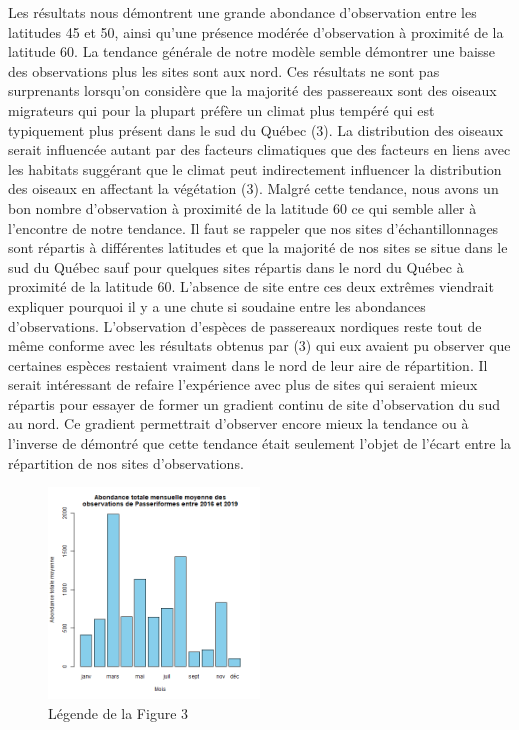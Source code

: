 \documentclass[9pt,twocolumn,twoside,]{pnas-new}
\begin{document}
Les résultats nous démontrent une grande abondance d'observation entre
les latitudes 45 et 50, ainsi qu'une présence modérée d'observation à
proximité de la latitude 60. La tendance générale de notre modèle semble
démontrer une baisse des observations plus les sites sont aux nord. Ces
résultats ne sont pas surprenants lorsqu'on considère que la majorité
des passereaux sont des oiseaux migrateurs qui pour la plupart préfère
un climat plus tempéré qui est typiquement plus présent dans le sud du
Québec (3). La distribution des oiseaux serait influencée autant par des
facteurs climatiques que des facteurs en liens avec les habitats
suggérant que le climat peut indirectement influencer la distribution
des oiseaux en affectant la végétation (3). Malgré cette tendance, nous
avons un bon nombre d'observation à proximité de la latitude 60 ce qui
semble aller à l'encontre de notre tendance. Il faut se rappeler que nos
sites d'échantillonnages sont répartis à différentes latitudes et que la
majorité de nos sites se situe dans le sud du Québec sauf pour quelques
sites répartis dans le nord du Québec à proximité de la latitude 60.
L'absence de site entre ces deux extrêmes viendrait expliquer pourquoi
il y a une chute si soudaine entre les abondances d'observations.
L'observation d'espèces de passereaux nordiques reste tout de même
conforme avec les résultats obtenus par (3) qui eux avaient pu observer
que certaines espèces restaient vraiment dans le nord de leur aire de
répartition. Il serait intéressant de refaire l'expérience avec plus de
sites qui seraient mieux répartis pour essayer de former un gradient
continu de site d'observation du sud au nord. Ce gradient permettrait
d'observer encore mieux la tendance ou à l'inverse de démontré que cette
tendance était seulement l'objet de l'écart entre la répartition de nos
sites d'observations.

\begin{figure}
\centering
\includegraphics[width=0.5\textwidth,height=0.4\textheight]{Figure4.png}
\caption{Légende de la Figure 3}
\end{figure}
\end{document}

